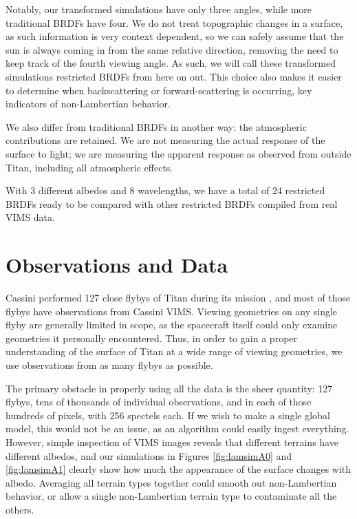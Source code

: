 \documentclass[twocolumn,linenumbers]{aastex631}
\begin{document}
Notably, our transformed simulations have only three angles, while more traditional BRDFs have four. We do not treat topographic changes in a surface, as such information is very context dependent, so we can safely assume that the sun is always coming in from the same relative direction, removing the need to keep track of the fourth viewing angle. As such, we will call these transformed simulations restricted BRDFs from here on out. This choice also makes it easier to determine when backscattering or forward-scattering is occurring, key indicators of non-Lambertian behavior.

We also differ from traditional BRDFs in another way: the atmospheric contributions are retained. We are not measuring the actual response of the surface to light; we are measuring the apparent response as observed from outside Titan, including all atmospheric effects.

With 3 different albedos and 8 wavelengths, we have a total of 24 restricted BRDFs ready to be compared with other restricted BRDFs compiled from real VIMS data.

\section{Observations and Data} \label{sec:observe}

Cassini performed 127 close flybys of Titan during its mission \citep{Seal2017}, and most of those flybys have observations from Cassini VIMS. Viewing geometries on any single flyby are generally limited in scope, as the spacecraft itself could only examine geometries it personally encountered. Thus, in order to gain a proper understanding of the surface of Titan at a wide range of viewing geometries, we use observations from as many flybys as possible.

The primary obstacle in properly using all the data is the sheer quantity: 127 flybys, tens of thousands of individual observations, and in each of those hundreds of pixels, with 256 spectels each. If we wish to make a single global model, this would not be an issue, as an algorithm could easily ingest everything. However, simple inspection of VIMS images reveals that different terrains have different albedos, and our simulations in Figures \ref{fig:lamsimA0} and \ref{fig:lamsimA1} clearly show how much the appearance of the surface changes with albedo. Averaging all terrain types together could smooth out non-Lambertian behavior, or allow a single non-Lambertian terrain type to contaminate all the others.
\end{document}
